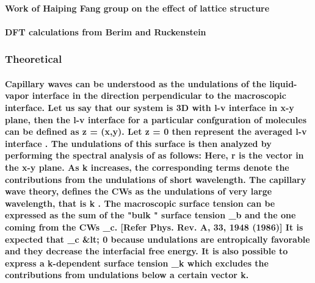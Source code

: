 \documentclass[a4paper,12pt,single,pdftex]{scrartcl}
\begin{document}
\label{ID_1854553780}\paragraph{Work of Haiping Fang group on the effect of lattice structure}

\label{ID_314119525}\paragraph{DFT calculations from Berim and Ruckenstein}

\label{ID_1942058277}\subsubsection{Theoretical}

\label{ID_896680657}\paragraph{Capillary waves can be understood as the undulations of the liquid-vapor interface in the direction perpendicular to the macroscopic interface. Let us say that our system is 3D with l-v interface in x-y plane, then the l-v interface for a particular confguration of molecules can be defined as z = \xi (x,y). Let z = 0 then represent the averaged l-v interface . The undulations of this surface is then analyzed by performing the spectral analysis of \xi as follows: Here, r is the vector  in the x-y plane. As k increases, the corresponding terms denote the contributions from the undulations of short wavelength. The capillary wave theory, defines the CWs as the undulations of very large wavelength, that is k . The macroscopic surface tension  \sigma can be expressed as the sum of the "bulk " surface tension  \sigma_b and the one coming from the CWs \sigma_c. [Refer Phys. Rev. A, 33, 1948 (1986)] It is expected that \sigma_c &lt; 0 because undulations are entropically favorable and they decrease the interfacial free energy.  It is also possible to express a k-dependent surface tension \sigma_k which excludes the contributions from undulations below a certain vector k.}
\end{document}
